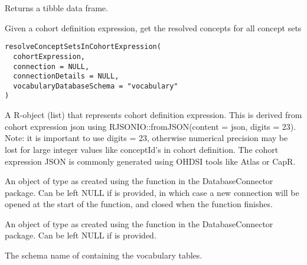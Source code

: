 \documentclass[a4paper]{book}
\begin{document}
%
\begin{Value}
Returns a tibble data frame.
\end{Value}
%
\begin{Description}\relax
Given a cohort definition expression, get the resolved concepts for all concept sets
\end{Description}
%
\begin{Usage}
\begin{verbatim}
resolveConceptSetsInCohortExpression(
  cohortExpression,
  connection = NULL,
  connectionDetails = NULL,
  vocabularyDatabaseSchema = "vocabulary"
)
\end{verbatim}
\end{Usage}
%
\begin{Arguments}
\begin{ldescription}
\item[\code{cohortExpression}] A R-object (list) that represents cohort definition expression. This is derived from cohort expression json 
using RJSONIO::fromJSON(content = json, digits = 23). Note: it is important to use digits = 23, otherwise
numerical precision may be lost for large integer values like conceptId's in cohort definition. The cohort
expression JSON is commonly generated using OHDSI tools like Atlas or CapR.

\item[\code{connection}] An object of type  as created using the
 function in the
DatabaseConnector package. Can be left NULL if 
is provided, in which case a new connection will be opened at the start
of the function, and closed when the function finishes.

\item[\code{connectionDetails}] An object of type  as created using the
 function in the
DatabaseConnector package. Can be left NULL if  is
provided.

\item[\code{vocabularyDatabaseSchema}] The schema name of containing the vocabulary tables.
\end{ldescription}
\end{Arguments}
\printindex{}
\end{document}
